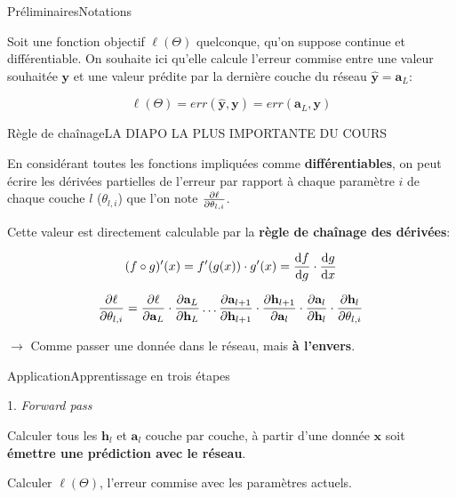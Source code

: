 \documentclass[12pt,dvipsnames,aspectratio=169]{beamer}
\newcommand{\x}[0]{\mathbf{x}}
\newcommand{\y}[0]{\mathbf{y}}
\newcommand{\hl}[0]{\mathbf{h}_l}
\newcommand{\al}[0]{\mathbf{a}_{l}}
\begin{document}
\begin{frame}{Préliminaires}{Notations}

Soit une fonction objectif $\ell({\Theta})$ quelconque, qu'on suppose continue et différentiable. On souhaite ici qu'elle calcule l'erreur commise entre une valeur souhaitée $\y$ et une valeur prédite par la dernière couche du réseau $\hat{\y} = \mathbf{a}_L$:

\begin{equation*}
    \ell({\Theta}) = err(\hat{\y}, \y) = err(\mathbf{a}_L, \y)
\end{equation*}

\end{frame}


\begin{frame}{Règle de chaînage}{LA DIAPO LA PLUS IMPORTANTE DU COURS}

En considérant toutes les fonctions impliquées comme \textbf{différentiables}, on peut écrire les dérivées partielles de l'erreur par rapport à chaque paramètre $i$ de chaque couche $l$ ($\theta_{l, i}$) que l'on note $\pdv{\ell}{\theta_{l, i}}$.

Cette valeur est directement calculable par la \textbf{règle de chaînage des dérivées}:

\begin{equation*}
    (f \circ g)'(x) = f'(g(x)) \cdot g'(x) = \odv{f}{g} \cdot \odv{g}{x}
\end{equation*}

\begin{equation*}
    \pdv{\ell}{\theta_{l, i}} = \pdv{\ell}{\mathbf{a}_L} \cdot \pdv{\mathbf{a}_L}{\mathbf{h}_L} \dots \pdv{\mathbf{a}_{l+1}}{\mathbf{h}_{l+1}} \cdot \pdv{\mathbf{h}_{l+1}}{\al} \cdot \pdv{\al}{\hl} \cdot \pdv{\hl}{\theta_{l, i}}
\end{equation*}

$\rightarrow$ Comme passer une donnée dans le réseau, mais \textbf{à l'envers}.

\end{frame}

\begin{frame}{Application}{Apprentissage en trois étapes}

    \begin{block}{1. \textit{Forward pass}}
    
        Calculer tous les $\hl$ et $\al$ couche par couche, à partir d'une donnée $\x$ soit \textbf{émettre une prédiction avec le réseau}.\par
        Calculer $\ell({\Theta})$, l'erreur commise avec les paramètres actuels.
        
    \end{block}
    
\end{frame}
\end{document}
